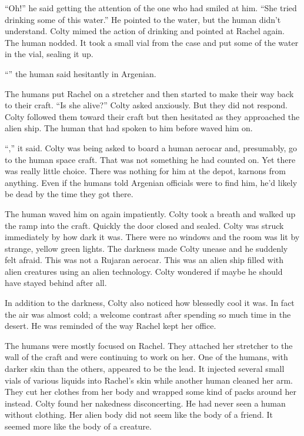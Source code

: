 ``Oh!'' he said getting the attention of the one who had smiled at him. ``She tried drinking
some of this water.'' He pointed to the water, but the human didn't understand. Colty mimed the
action of drinking and pointed at Rachel again. The human nodded. It took a small vial from the
case and put some of the water in the vial, sealing it up.

``'' the human said hesitantly in Argenian.

The humans put Rachel on a stretcher and then started to make their way back to their craft.
``Is she alive?'' Colty asked anxiously. But they did not respond. Colty followed them toward
their craft but then hesitated as they approached the alien ship. The human that had spoken to
him before waved him on.

``,'' it said. Colty was being asked to board a human aerocar and, presumably, go to
the human space craft. That was not something he had counted on. Yet there was really little
choice. There was nothing for him at the depot, karnons from anything. Even if the humans told
Argenian officials were to find him, he'd likely be dead by the time they got there.

The human waved him on again impatiently. Colty took a breath and walked up the ramp into the
craft. Quickly the door closed and sealed. Colty was struck immediately by how dark it was.
There were no windows and the room was lit by strange, yellow green lights. The darkness made
Colty unease and he suddenly felt afraid. This was not a Rujaran aerocar. This was an alien
ship filled with alien creatures using an alien technology. Colty wondered if maybe he should
have stayed behind after all.

In addition to the darkness, Colty also noticed how blessedly cool it was. In fact the air was
almost cold; a welcome contrast after spending so much time in the desert. He was reminded of
the way Rachel kept her office.

The humans were mostly focused on Rachel. They attached her stretcher to the wall of the craft
and were continuing to work on her. One of the humans, with darker skin than the others,
appeared to be the lead. It injected several small vials of various liquids into Rachel's skin
while another human cleaned her arm. They cut her clothes from her body and wrapped some kind of
packs around her instead. Colty found her nakedness disconcerting. He had never seen a human
without clothing. Her alien body did not seem like the body of a friend. It seemed more like the
body of a creature.

